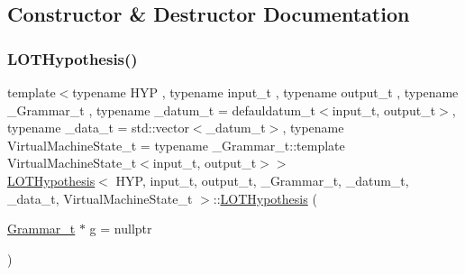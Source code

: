 \subsection{Constructor \& Destructor Documentation}
\mbox{\label{class_l_o_t_hypothesis_a2c1ff366f7a839d9acae415823ceb112}} 
\subsubsection{\texorpdfstring{L\+O\+T\+Hypothesis()}{LOTHypothesis()}\hspace{0.1cm}{\footnotesize\ttfamily [1/4]}}
{\footnotesize\ttfamily template$<$typename H\+YP , typename input\+\_\+t , typename output\+\_\+t , typename \+\_\+\+Grammar\+\_\+t , typename \+\_\+datum\+\_\+t  = defauldatum\+\_\+t$<$input\+\_\+t, output\+\_\+t$>$, typename \+\_\+data\+\_\+t  = std\+::vector$<$\+\_\+datum\+\_\+t$>$, typename Virtual\+Machine\+State\+\_\+t  = typename \+\_\+\+Grammar\+\_\+t\+::template Virtual\+Machine\+State\+\_\+t$<$input\+\_\+t, output\+\_\+t$>$$>$ \\
\hyperlink{class_l_o_t_hypothesis}{L\+O\+T\+Hypothesis}$<$ H\+YP, input\+\_\+t, output\+\_\+t, \+\_\+\+Grammar\+\_\+t, \+\_\+datum\+\_\+t, \+\_\+data\+\_\+t, Virtual\+Machine\+State\+\_\+t $>$\+::\hyperlink{class_l_o_t_hypothesis}{L\+O\+T\+Hypothesis} (\begin{DoxyParamCaption}\item[{\hyperlink{class_l_o_t_hypothesis_a8006204013d471860e54c49d19edbace}{Grammar\+\_\+t} $\ast$}]{g = {\ttfamily nullptr} }\end{DoxyParamCaption})\hspace{0.3cm}{\ttfamily [inline]}}

\mbox{\label{class_l_o_t_hypothesis_aa14b68e8efcb570186fe289bc4a791d5}} 
